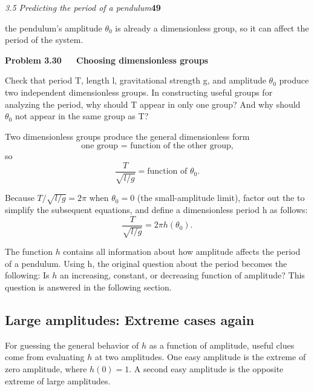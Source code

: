 \documentclass[a4paper, 11pt]{book}
\begin{document}
\large\textit{3.5 Predicting the period of a pendulum}\hfill \textbf{49} \\
\vspace{15pt}

the pendulum’s amplitude $\theta_{0}$ is already a dimensionless group, so it can
affect the period of the system.\\


\colorbox{light-gray}{
\begin{minipage}{\textwidth}

\textbf{Problem 3.30~~~Choosing dimensionless groups}

Check that period T, length l, gravitational strength g, and amplitude $\theta_{0}$ produce
two independent dimensionless groups. In constructing useful groups for
analyzing the period, why should T appear in only one group? And why should
$\theta_{0}$ not appear in the same group as T?

\end{minipage} }
\vspace{5pt}

Two dimensionless groups produce the general dimensionless form
\begin{equation}
\textrm {one group = function of the other group,} 
\end{equation}
so
\begin{equation}
\frac{T}{\sqrt{l/g}}=
\textrm{function of $\theta_{0}$}.
\end{equation}
\vspace{5pt}

Because $T/{\sqrt{l/g}}=2\pi $ when $\theta_{0}=0$ (the small-amplitude limit), factor out
the  to simplify the subsequent equations, and define a dimensionless
period h as follows:
\begin{equation}
\frac{T}{\sqrt{l/g}}=2\pi h(\theta_{0}).
\end{equation}

The function $h$ contains all information about how amplitude affects the
period of a pendulum. Using h, the original question about the period becomes
the following: Is $h$ an increasing, constant, or decreasing function
of amplitude? This question is answered in the following section.

\subsection{Large amplitudes: Extreme cases again}

For guessing the general behavior of $h$ as a function of amplitude, useful
clues come from evaluating $h$ at two amplitudes. One easy amplitude is
the extreme of zero amplitude, where $h(0) = 1$. A second easy amplitude
is the opposite extreme of large amplitudes.\\
\end{document}
